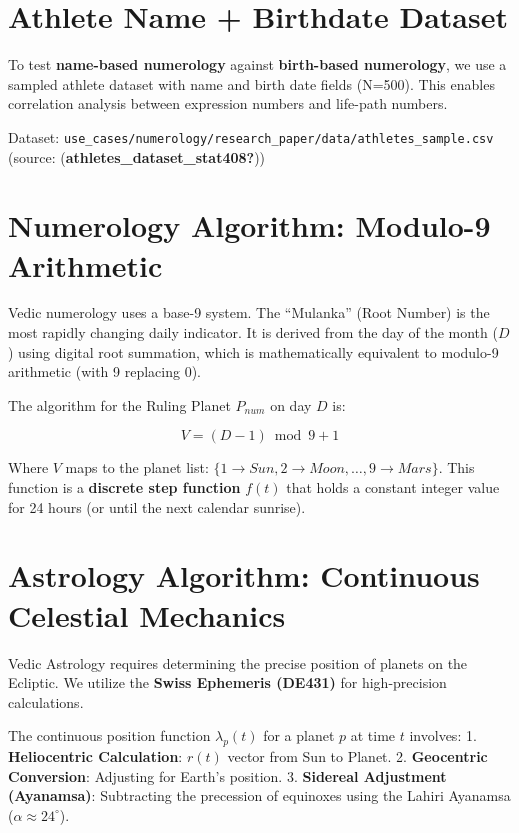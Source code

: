 \documentclass[
  11pt,
  a4paper,
  oneside,
  openany]{report}
\begin{document}
\section{Athlete Name + Birthdate
Dataset}\label{athlete-name-birthdate-dataset}

To test \textbf{name-based numerology} against \textbf{birth-based
numerology}, we use a sampled athlete dataset with name and birth date
fields (N=500). This enables correlation analysis between expression
numbers and life-path numbers.

Dataset:
\texttt{use\_cases/numerology/research\_paper/data/athletes\_sample.csv}
(source: (\textbf{athletes\_dataset\_stat408?}))

\section{Numerology Algorithm: Modulo-9
Arithmetic}\label{numerology-algorithm-modulo-9-arithmetic}

Vedic numerology uses a base-9 system. The ``Mulanka'' (Root Number) is
the most rapidly changing daily indicator. It is derived from the day of
the month (\(D\)) using digital root summation, which is mathematically
equivalent to modulo-9 arithmetic (with 9 replacing 0).

The algorithm for the Ruling Planet \(P_{num}\) on day \(D\) is:

\[
V = (D - 1) \bmod 9 + 1
\]

Where \(V\) maps to the planet list:
\(\{1 \to Sun, 2 \to Moon, \dots, 9 \to Mars\}\). This function is a
\textbf{discrete step function} \(f(t)\) that holds a constant integer
value for 24 hours (or until the next calendar sunrise).

\section{Astrology Algorithm: Continuous Celestial
Mechanics}\label{astrology-algorithm-continuous-celestial-mechanics}

Vedic Astrology requires determining the precise position of planets on
the Ecliptic. We utilize the \textbf{Swiss Ephemeris (DE431)} for
high-precision calculations.

The continuous position function \(\lambda_p(t)\) for a planet \(p\) at
time \(t\) involves: 1. \textbf{Heliocentric Calculation}: \(r(t)\)
vector from Sun to Planet. 2. \textbf{Geocentric Conversion}: Adjusting
for Earth's position. 3. \textbf{Sidereal Adjustment (Ayanamsa)}:
Subtracting the precession of equinoxes using the Lahiri Ayanamsa
(\(\alpha \approx 24^\circ\)).
\end{document}
